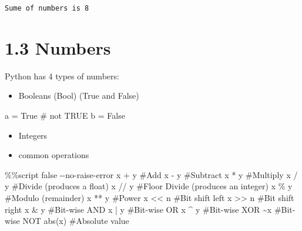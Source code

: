 \documentclass[
  letterpaper,
  DIV=11,
  numbers=noendperiod]{scrreprt}
\newenvironment{Shaded}{\begin{snugshade}}{\end{snugshade}}
\newcommand{\BuiltInTok}[1]{\textcolor[rgb]{0.00,0.46,0.62}{#1}}
\newcommand{\BuiltInTok}[1]{\textcolor[rgb]{0.00,0.48,0.65}{#1}}
\newcommand{\CommentTok}[1]{\textcolor[rgb]{0.37,0.37,0.37}{#1}}
\newcommand{\ControlFlowTok}[1]{\textcolor[rgb]{0.00,0.46,0.62}{#1}}
\newcommand{\ControlFlowTok}[1]{\textcolor[rgb]{0.00,0.48,0.65}{#1}}
\newcommand{\NormalTok}[1]{\textcolor[rgb]{0.00,0.46,0.62}{#1}}
\newcommand{\OperatorTok}[1]{\textcolor[rgb]{0.37,0.37,0.37}{#1}}
\newcommand{\NormalTok}[1]{\textcolor[rgb]{0.00,0.48,0.65}{#1}}
\newcommand{\OperatorTok}[1]{\textcolor[rgb]{0.37,0.37,0.37}{#1}}
\newcommand{\VariableTok}[1]{\textcolor[rgb]{0.07,0.07,0.07}{#1}}
\providecommand{\tightlist}{%
  \setlength{\itemsep}{0pt}\setlength{\parskip}{0pt}}
\begin{document}
\begin{Shaded}
\begin{Highlighting}[]
\begin{verbatim}
Sume of numbers is 8
\end{verbatim}

\hypertarget{numbers}{%
\section{1.3 Numbers}\label{numbers}}

Python has 4 types of numbers:

\begin{itemize}
\tightlist
\item
  Booleans (Bool) (True and False)
\end{itemize}

\begin{Shaded}
\begin{Highlighting}[]
\NormalTok{a }\OperatorTok{=} \VariableTok{True} \CommentTok{\# not TRUE}
\NormalTok{b }\OperatorTok{=} \VariableTok{False}
\end{Highlighting}
\end{Shaded}

\begin{itemize}
\item
  Integers
\item
  common operations
\end{itemize}

\begin{Shaded}
\begin{Highlighting}[]
\OperatorTok{\%\%}\NormalTok{script false }\OperatorTok{{-}{-}}\NormalTok{no}\OperatorTok{{-}}\ControlFlowTok{raise}\OperatorTok{{-}}\NormalTok{error}
\NormalTok{x }\OperatorTok{+}\NormalTok{ y      }\CommentTok{\#Add}
\NormalTok{x }\OperatorTok{{-}}\NormalTok{ y      }\CommentTok{\#Subtract}
\NormalTok{x }\OperatorTok{*}\NormalTok{ y      }\CommentTok{\#Multiply}
\NormalTok{x }\OperatorTok{/}\NormalTok{ y      }\CommentTok{\#Divide (produces a float)}
\NormalTok{x }\OperatorTok{//}\NormalTok{ y     }\CommentTok{\#Floor Divide (produces an integer)}
\NormalTok{x }\OperatorTok{\%}\NormalTok{ y      }\CommentTok{\#Modulo (remainder)}
\NormalTok{x }\OperatorTok{**}\NormalTok{ y     }\CommentTok{\#Power}
\NormalTok{x }\OperatorTok{\textless{}\textless{}}\NormalTok{ n     }\CommentTok{\#Bit shift left}
\NormalTok{x }\OperatorTok{\textgreater{}\textgreater{}}\NormalTok{ n     }\CommentTok{\#Bit shift right}
\NormalTok{x }\OperatorTok{\&}\NormalTok{ y      }\CommentTok{\#Bit{-}wise AND}
\NormalTok{x }\OperatorTok{|}\NormalTok{ y      }\CommentTok{\#Bit{-}wise OR}
\NormalTok{x }\OperatorTok{\^{}}\NormalTok{ y      }\CommentTok{\#Bit{-}wise XOR}
\OperatorTok{\textasciitilde{}}\NormalTok{x         }\CommentTok{\#Bit{-}wise NOT}
\BuiltInTok{abs}\NormalTok{(x)     }\CommentTok{\#Absolute value}
\end{Highlighting}
\end{Shaded}


\end{Highlighting}
\end{Shaded}
\end{document}
